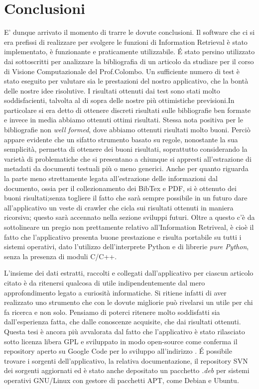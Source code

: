 \section{Conclusioni} \label{conclusioni}
E' dunque arrivato il momento di trarre le dovute conclusioni. Il software che ci si era prefissi di realizzare per svolgere le funzioni di Information Retrieval è stato implementato, è funzionante e praticamente utilizzabile. \'E stato persino utilizzato dai sottoscritti per analizzare la bibliografia di un articolo da studiare per il corso di Visione Computazionale del Prof.Colombo. Un sufficiente numero di test è stato eseguito per valutare sia le prestazioni del nostro applicativo, che la bontà delle nostre idee risolutive. I risultati ottenuti dai test sono stati molto soddisfacienti, talvolta al di sopra delle nostre  più ottimistiche previsioni.In particolare si era detto di ottenere discreti risultati sulle bibliografie ben formate e invece in media abbiamo ottenuti ottimi risultati. Stessa nota positiva per le bibliografie non \textit{well formed}, dove abbiamo ottenuti risultati molto buoni. Perciò appare evidente che un sifatto strumento basato su regole, nonostante la sua semplicità, permetta di ottenere dei buoni risultati, soprattutto considerando la varietà di problematiche che si presentano a chiunque si appresti all'estrazione di metadati da documenti testuali più o meno generici. Anche per quanto riguarda la parte meno strettamente legata all'estrazione delle informazioni dal documento, ossia per il collezionamento dei BibTex e PDF, si è ottenuto dei buoni risultati;senza togliere il fatto che sarà sempre possibile in un futuro dare all'applicativo un veste di crawler che cicla sui risultati ottenuti in maniera ricorsiva; questo sarà accennato nella sezione sviluppi futuri. Oltre a questo c'è da sottolineare un pregio non prettamente relativo all'Information Retriveal, è cioè il fatto che l'applicativo presenta buone prestazione e risulta portabile su tutti i sistemi operativi, dato l'utilizzo dell'interprete Python e di librerie \textit{pure Python}, senza la presenza di moduli C/C++.

L'insieme dei dati estratti, raccolti e collegati dall'applicativo per ciascun articolo citato è da ritenersi qualcosa di utile indipendentemente dal mero approfondimento legato a curiosità informatiche. Si ritiene infatti di aver realizzato uno strumento che con le dovute migliorie può rivelarsi un utile per chi fa ricerca e non solo. Pensiamo di poterci ritenere molto soddisfatti sia dall'esperienza fatta, che dalle conoscenze acquisite, che dai risultati ottenuti. Questa tesi è ancora più avvalorata dal fatto che l'applicativo è stato rilasciato sotto licenza libera GPL e sviluppato in modo open-source come conferma il repository aperto su Google Code per lo sviluppo all'indirizzo  . \'E possibile trovare i sorgenti dell'applicativo, la relativa documentazione, il repository SVN dei sorgenti aggiornati ed è stato anche depositato un pacchetto \textit{.deb} per sistemi operativi GNU/Linux con gestore di pacchetti APT, come Debian e Ubuntu.

